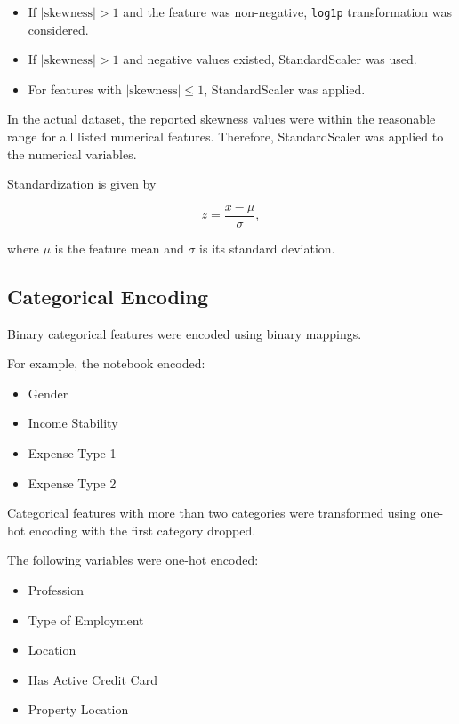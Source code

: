 \documentclass[12pt,a4paper]{article}
\begin{document}
\begin{itemize}
    \item If $|\text{skewness}| > 1$ and the feature was non-negative,
    \texttt{log1p} transformation was considered.
    
    \item If $|\text{skewness}| > 1$ and negative values existed,
    StandardScaler was used.
    
    \item For features with $|\text{skewness}| \leq 1$, StandardScaler was
    applied.
\end{itemize}

In the actual dataset, the reported skewness values were within the
reasonable range for all listed numerical features. Therefore,
StandardScaler was applied to the numerical variables.

Standardization is given by

\[
z = \frac{x-\mu}{\sigma},
\]

where $\mu$ is the feature mean and $\sigma$ is its standard deviation.

\subsection{Categorical Encoding}

Binary categorical features were encoded using binary mappings.

For example, the notebook encoded:

\begin{itemize}
    \item Gender
    \item Income Stability
    \item Expense Type 1
    \item Expense Type 2
\end{itemize}

Categorical features with more than two categories were transformed using
one-hot encoding with the first category dropped.

The following variables were one-hot encoded:

\begin{itemize}
    \item Profession
    \item Type of Employment
    \item Location
    \item Has Active Credit Card
    \item Property Location
\end{itemize}
\end{document}
